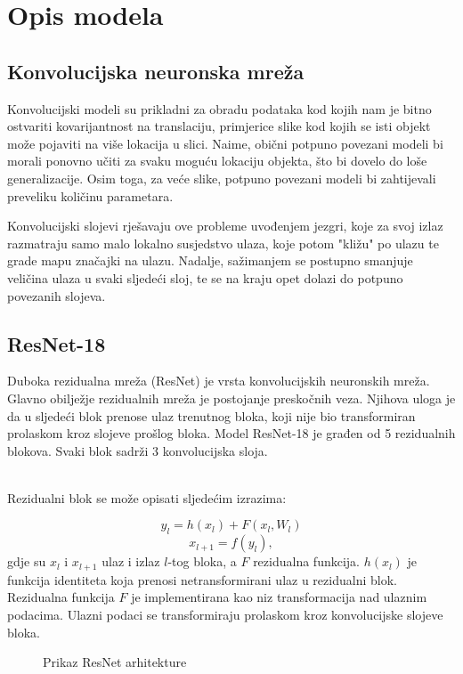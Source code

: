 \chapter{Opis modela}

\section{Konvolucijska neuronska mreža}

Konvolucijski modeli su prikladni za obradu podataka kod kojih nam je bitno ostvariti kovarijantnost na translaciju, primjerice slike kod kojih se isti objekt može pojaviti na više lokacija u slici. Naime, obični potpuno povezani modeli bi morali ponovno učiti za svaku moguću lokaciju objekta, što bi dovelo do loše generalizacije. Osim toga, za veće slike, potpuno povezani modeli bi zahtijevali preveliku količinu parametara.

Konvolucijski slojevi rješavaju ove probleme uvođenjem jezgri, koje za svoj izlaz razmatraju samo malo lokalno susjedstvo ulaza, koje potom "kližu" po ulazu te grade mapu značajki na ulazu. Nadalje, sažimanjem se postupno smanjuje veličina ulaza u svaki sljedeći sloj, te se na kraju opet dolazi do potpuno povezanih slojeva.

\section{ResNet-18}

Duboka rezidualna mreža (ResNet) je vrsta konvolucijskih neuronskih mreža. Glavno obilježje rezidualnih mreža je postojanje preskočnih veza. Njihova uloga je da u sljedeći blok prenose ulaz trenutnog bloka, koji nije bio transformiran prolaskom kroz slojeve prošlog bloka. Model ResNet-18 je građen od 5 rezidualnih blokova. Svaki blok sadrži 3 konvolucijska sloja.

\noindent\\Rezidualni blok se može opisati sljedećim izrazima:

\[y_{l} = h(x_{l}) + F(x_{l}, W_{l})\]
\[x_{l+1} = f(y_{l}),\]
gdje su \(x_{l}\) i \(x_{l+1}\) ulaz i izlaz \(l\)-tog bloka, a \(F\) rezidualna funkcija. \(h(x_{l})\) je funkcija identiteta koja prenosi netransformirani ulaz u rezidualni blok. Rezidualna funkcija \(F\) je implementirana kao niz transformacija nad ulaznim podacima. Ulazni podaci se transformiraju prolaskom kroz konvolucijske slojeve bloka.

\begin{figure}[h]
	\caption{Prikaz ResNet arhitekture}
	\label{resnet}
\end{figure}